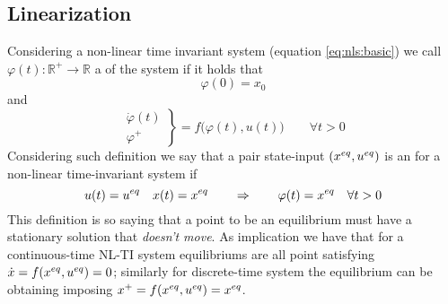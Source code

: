 	\subsection{Linearization}
		Considering a non-linear time invariant system (equation \ref{eq:nls:basic}) we call $\varphi(t):\mathds R^+\rightarrow \mathds R$ a  of the system if it holds that
		\[ \varphi(0) = x_0 \]
		and 
		\[ \left. \begin{aligned}
			\dot \varphi(t) \\ \varphi^+
		\end{aligned} \right\} = f\big(\varphi(t), u(t)\big) \qquad \forall t> 0 \]
		Considering such definition we say that a pair state-input $(x^{eq},u^{eq})$ is an  for a non-linear time-invariant system if
		\[ u(t) = u^{eq} \quad x(t) = x^{eq} \qquad \Rightarrow \qquad \varphi(t) = x^{eq} \quad \forall t>0 \]
		This definition is so saying that a point to be an equilibrium must have a stationary solution that \textit{doesn't move}. As implication we have that for a continuous-time NL-TI system equilibriums are all point satisfying $\dot x = f(x^{eq},u^{eq}) = 0$; similarly for discrete-time system the equilibrium can be obtaining imposing $x^+ = f(x^{eq},u^{eq}) = x^{eq}$.
		

